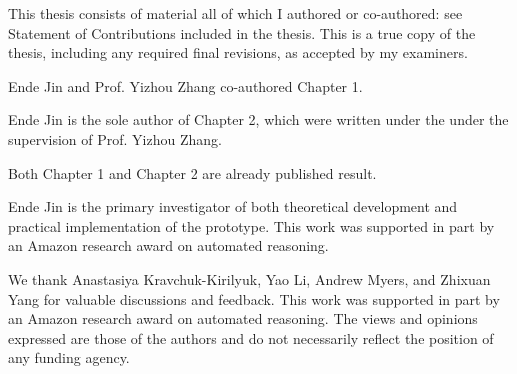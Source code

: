 


\vspace*{\fill}
\begin{center}
  \textsc{\Huge \thetitle}
\end{center}


\vspace*{\fill}

\newpage

\setcounter{page}{1}

\vspace*{\fill}


This thesis consists of material all of which I authored or co-authored: see Statement of Contributions included in the thesis. This is a true copy of the thesis, including any required final revisions, as accepted by my examiners.

\vspace*{\fill}

\newpage 


\vspace*{\fill}


Ende Jin and Prof. Yizhou Zhang co-authored Chapter 1.

Ende Jin is the sole author of Chapter 2, which were written under the  under the supervision of Prof. Yizhou Zhang.

Both Chapter 1 and Chapter 2 are already published result.

 Ende Jin is the primary investigator of both theoretical development and practical implementation of the prototype. This work was supported in part by an Amazon research award on automated
reasoning.

\vspace*{\fill}

\newpage


\vspace*{\fill}


\vspace*{\fill}


\newpage


\vspace*{\fill}

We thank Anastasiya Kravchuk-Kirilyuk, Yao Li, Andrew Myers, and Zhixuan Yang
for valuable discussions and feedback.
This work was supported in part by an Amazon research award on automated
reasoning.
The views and opinions expressed are those of the authors and do not necessarily
reflect the position of any funding agency.
\vspace*{\fill}

\newpage
\tableofcontents